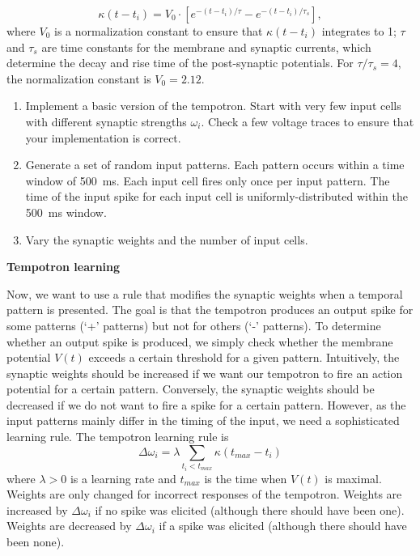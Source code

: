 \documentclass[12pt]{article}
\begin{document}
$$\kappa (t -
t_i)=V_0\cdot\left[e^{-(t-t_i)/\tau}-e^{-(t-t_i)/\tau_s}\right],$$
where $V_0$ is a normalization constant to ensure that $\kappa (t -
t_i)$ integrates to 1; $\tau$ and $\tau_s$ are time constants for the membrane
and synaptic currents,  which determine the decay and
rise time of the post-synaptic potentials. For $\tau/\tau_s = 4$, the
normalization constant is  $V_0=2.12$.

\begin{enumerate}
   \item Implement a basic version of the tempotron. Start with very
   few input cells with different synaptic strengths $\omega_i$. Check
   a few voltage traces to ensure that your implementation is correct.
   \item Generate a set of random input patterns. Each pattern occurs
   within a time window of 500~ms. Each input cell fires only once
   per input pattern. The time of the input spike for each input cell
   is uniformly-distributed within the 500~ms window.
   \item Vary the synaptic weights and the number of input cells.
\end{enumerate}    

{\bf Tempotron learning} 

Now, we want to use a rule that modifies
the synaptic weights when a temporal pattern is presented. The goal is
that the tempotron produces an output spike for some patterns (`+'
patterns) but not for others (`-' patterns). To determine whether an
output spike is produced, we simply check whether the membrane
potential $V(t)$ exceeds a certain threshold for a given pattern.
Intuitively, the synaptic weights should be increased if we want our
tempotron to fire an action potential for a certain pattern.
Conversely, the synaptic weights should be decreased if we do not want
to fire a spike for a certain pattern. However, as the input patterns
mainly differ in the timing of the input, we need a sophisticated
learning rule. The tempotron learning rule is
  $$ \Delta\omega_i = \lambda \sum_{t_i<t_{max}} \kappa
  (t_{max}-t_i)$$ where $\lambda>0$ is a learning rate and $t_{max}$
  is the time when $V(t)$ is maximal. Weights are only changed for
  incorrect responses of the tempotron. Weights are increased by
  $\Delta\omega_i$ if no spike was elicited (although there should have
  been one). Weights are decreased by $\Delta\omega_i$ if a spike was
  elicited (although there should have been none).
\end{document}
